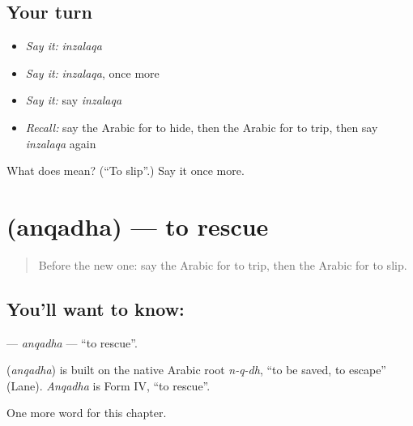 \subsection*{Your turn}
\begin{itemize}
\raggedright
  \item \emph{Say it:} \emph{inzalaqa}
  \item \emph{Say it:} \emph{inzalaqa}, once more
  \item \emph{Say it:} say \emph{inzalaqa}
  \item \emph{Recall:} say the Arabic for to hide, then the Arabic for to trip, then say \emph{inzalaqa} again
\end{itemize}

\begin{tcolorbox}[breakable,colback=teal!4,colframe=teal!35!black,title={Before you move on}]
What does  mean? (\textquotedblleft{}To slip\textquotedblright{}.) Say it once more.
\end{tcolorbox}
\section[\texorpdfstring{\ar{أنقذ} (anqadha)}{أنقذ (anqadha)}]{ (anqadha) — to rescue}

\label{lesson:AR-C167-anqadha}



\begin{quote}
Before the new one: say the Arabic for to trip, then the Arabic for to slip.
\end{quote}

\subsection*{You'll want to know: }
\textbf{} — \emph{anqadha} — \textquotedblleft{}to rescue\textquotedblright{}.

\begin{cousinweb}
\textbf{} (\emph{anqadha}) is built on the native Arabic root \emph{n-q-dh}, \textquotedblleft{}to be saved, to escape\textquotedblright{} (Lane). \emph{Anqadha} is Form IV, \textquotedblleft{}to rescue\textquotedblright{}.
\end{cousinweb}

\begin{grammarlens}[title={What you've built}]
One more word for this chapter.
\end{grammarlens}

